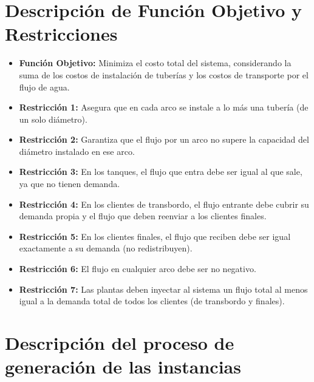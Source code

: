 \documentclass[12pt]{article}
\begin{document}
\vspace{7cm}


\section{Descripción de Función Objetivo y Restricciones}

\begin{itemize}
    \item \textbf{Función Objetivo:} Minimiza el costo total del sistema, considerando la suma de los costos de instalación de tuberías y los costos de transporte por el flujo de agua.\\
    
    \item \textbf{Restricción 1:} Asegura que en cada arco se instale a lo más una tubería (de un solo diámetro).\\

    \item \textbf{Restricción 2:} Garantiza que el flujo por un arco no supere la capacidad del diámetro instalado en ese arco. \\


    \item \textbf{Restricción 3:} En los tanques, el flujo que entra debe ser igual al que sale, ya que no tienen demanda. \\

    \item \textbf{Restricción 4:} En los clientes de transbordo, el flujo entrante debe cubrir su demanda propia y el flujo que deben reenviar a los clientes finales. \\

    \item \textbf{Restricción 5:} En los clientes finales, el flujo que reciben debe ser igual exactamente a su demanda (no redistribuyen). \\

    \item \textbf{Restricción 6:} El flujo en cualquier arco debe ser no negativo. \\

    \item \textbf{Restricción 7:} Las plantas deben inyectar al sistema un flujo total al menos igual a la demanda total de todos los clientes (de transbordo y finales).
\end{itemize}
\vspace{8cm}


\section{Descripción del proceso de generación de las instancias}
\end{document}
